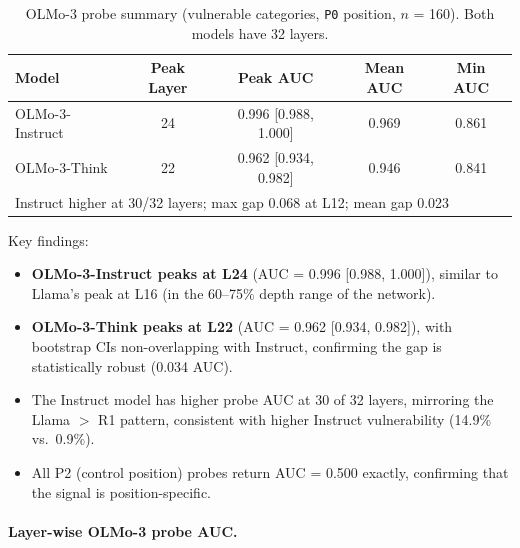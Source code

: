 \documentclass{article}
\newcommand{\pzero}{\texttt{P0}}
\begin{document}
\begin{table}[ht]
\centering
\caption{OLMo-3 probe summary (vulnerable categories, \pzero{} position,
  $n$ = 160).  Both models have 32 layers.}
\label{tab:olmo_probe_summary}
\vspace{4pt}
\small
\begin{tabular}{lcccc}
\toprule
\textbf{Model} & \textbf{Peak Layer} & \textbf{Peak AUC} & \textbf{Mean AUC} & \textbf{Min AUC} \\
\midrule
OLMo-3-Instruct & 24 & 0.996 [0.988, 1.000] & 0.969 & 0.861 \\
OLMo-3-Think    & 22 & 0.962 [0.934, 0.982] & 0.946 & 0.841 \\
\midrule
\multicolumn{5}{l}{Instruct higher at 30/32 layers; max gap 0.068 at L12; mean gap 0.023} \\
\bottomrule
\end{tabular}
\end{table}

\noindent Key findings:
\begin{itemize}[leftmargin=*,itemsep=2pt]
  \item \textbf{OLMo-3-Instruct peaks at L24} (AUC = 0.996 [0.988, 1.000]),
  similar to Llama's peak at L16 (in the 60--75\% depth range of the network).
  \item \textbf{OLMo-3-Think peaks at L22} (AUC = 0.962 [0.934, 0.982]),
  with bootstrap CIs non-overlapping with Instruct, confirming the gap
  is statistically robust (0.034 AUC).
  \item The Instruct model has higher probe AUC at 30 of 32 layers,
  mirroring the Llama $>$ R1 pattern, consistent with higher Instruct
  vulnerability (14.9\% vs.\ 0.9\%).
  \item All P2 (control position) probes return AUC = 0.500 exactly,
  confirming that the signal is position-specific.
\end{itemize}

\paragraph{Layer-wise OLMo-3 probe AUC.}
\end{document}
